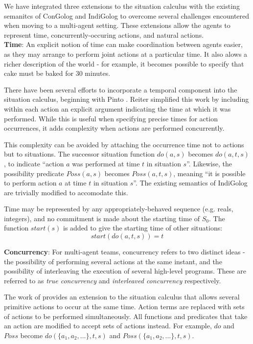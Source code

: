 \documentclass[letterpaper]{article}
\begin{document}
We have integrated three extensions to the situation calculus with the
existing semanitcs of ConGolog and IndiGolog to overcome several
challenges encountered when moving to a multi-agent setting.  These
extensions allow the agents to represent time, concurrently-occuring actions,
and natural actions.
\\

\textbf{Time}: An explicit notion of time can make coordination between agents
easier, as they may arrange to perform joint actions at a particular time.  It
also alows a richer description of the world - for example, it becomes possible
to specify that cake must be baked for 30 minutes.

There have been several efforts to incorporate a temporal component
into the situation calculus, beginning with Pinto \cite{pinto94temporal}.
Reiter \cite{reiter96sc_nat_conc} simplified this work by including
within each action an explicit argument indicating the time at which
it was performed. While this is useful when specifying precise times
for action occurrences, it adds complexity when actions are performed
concurrently.

This complexity can be avoided by attaching the occurrence time not
to actions but to situations. The successor situation function $do(a,s)$
becomes $do(a,t,s)$, to indicate ``action $a$ was performed at
time $t$ in situation $s$''. Likewise, the possibility predicate
$Poss(a,s)$ becomes $Poss(a,t,s)$, meaning ``it is possible to
perform action $a$ at time $t$ in situation $s$''.  The existing semantics
of IndiGolog are trivially modified to accomodate this.

Time may be represented by any appropriately-behaved sequence (e.g. reals,
integers), and no commitment is made about the starting time of $S_0$.
The function $start(s)$ is added to give the starting time of other situations:
\begin{equation}
start(do(a,t,s))=t
\end{equation}

\textbf{Concurrency}: 
For multi-agent teams, concurrency refers to two distinct ideas -
the possibility of performing several actions at the same instant,
and the possibility of interleaving the execution of several high-level
programs. These are referred to as \emph{true concurrency} and \emph{interleaved
concurrency} respectively.

The work of \cite{lin92sc_conc,reiter96sc_nat_conc} provides an extension
to the situation calculus that allows several primitive actions to
occur at the same time. Action terms are replaced with sets of actions
to be performed simultaneously. All functions and predicates that
take an action are modified to accept sets of actions instead. For
example, $do$ and $Poss$ become $do(\{ a_{1},a_{2},...\},t,s)$
and $Poss(\{ a_{1},a_{2},...\},t,s)$.
\end{document}
